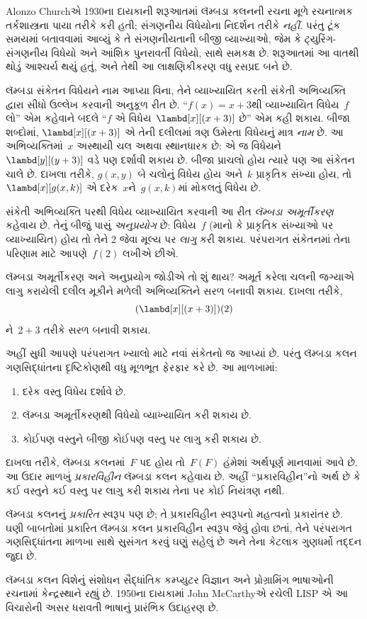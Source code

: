 \documentclass[../../../include/open-logic-section]{subfiles}
\begin{document}

Alonzo Churchએ 1930ના દાયકાની શરૂઆતમાં લૅમ્બડા કલનની રચના મૂળે
રચનાત્મક તર્કશાસ્ત્રના પાયા તરીકે કરી હતી; સંગણનીય વિધેયોના
નિદર્શન તરીકે \emph{નહીં}. પરંતુ ટૂંક સમયમાં બતાવવામાં આવ્યું કે
તે સંગણનીયતાની બીજી વ્યાખ્યાઓ, જેમ કે ટ્યુરિંગ-સંગણનીય વિધેયો
અને આંશિક પુનરાવર્તી વિધેયો, સાથે સમકક્ષ છે. શરૂઆતમાં આ વાતથી
થોડું આશ્ચર્ય થયું હતું, અને તેથી આ લાક્ષણિકીકરણ વધુ રસપ્રદ બને છે.

લૅમ્બડા સંકેતન વિધેયને નામ આપ્યા વિના, તેને વ્યાખ્યાયિત કરતી
સંકેતી અભિવ્યક્તિ દ્વારા સીધો ઉલ્લેખ કરવાની અનુકૂળ રીત છે.
``$f(x) = x + 3$થી વ્યાખ્યાયિત વિધેય~$f$ લો'' એમ કહેવાને બદલે
``$f$ એ વિધેય~$\lambd[x][(x + 3)]$ છે'' એમ કહી શકાય. બીજા શબ્દોમાં,
$\lambd[x][(x+3)]$ એ તેની દલીલમાં ત્રણ ઉમેરતા વિધેયનું માત્ર
\emph{નામ} છે. આ અભિવ્યક્તિમાં~$x$ અસ્થાયી ચલ અથવા સ્થાનધારક છે:
એ જ વિધેયને $\lambd[y][(y + 3)]$ વડે પણ દર્શાવી શકાય છે. બીજા
પ્રાચલો હોય ત્યારે પણ આ સંકેતન ચાલે છે. દાખલા તરીકે,
$g(x, y)$ બે ચલોનું વિધેય હોય અને~$k$ પ્રાકૃતિક સંખ્યા હોય,
તો~$\lambd[x][g(x,k)]$ એ દરેક~$x$ને~$g(x, k)$માં મોકલતું વિધેય છે.

સંકેતી અભિવ્યક્તિ પરથી વિધેય વ્યાખ્યાયિત કરવાની આ રીત
\emph{લૅમ્બડા અમૂર્તીકરણ} કહેવાય છે. તેનું બીજું પાસું
\emph{અનુપ્રયોગ} છે: વિધેય~$f$ (માનો કે પ્રાકૃતિક સંખ્યાઓ પર
વ્યાખ્યાયિત) હોય તો તેને 2 જેવા મૂલ્ય પર \emph{લાગુ} કરી શકાય.
પરંપરાગત સંકેતનમાં તેના પરિણામ માટે આપણે~$f(2)$ લખીએ છીએ.

લૅમ્બડા અમૂર્તીકરણ અને અનુપ્રયોગ જોડીએ તો શું થાય? અમૂર્ત કરેલા
ચલની જગ્યાએ લાગુ કરાયેલી દલીલ મૂકીને મળેલી અભિવ્યક્તિને સરળ બનાવી
શકાય. દાખલા તરીકે,
\[
(\lambd[x][(x + 3)])(2)
\]
ને~$2 + 3$ તરીકે સરળ બનાવી શકાય.

અહીં સુધી આપણે પરંપરાગત ખ્યાલો માટે નવાં સંકેતનો જ આપ્યાં છે.
પરંતુ લૅમ્બડા કલન ગણસિદ્ધાંતના દૃષ્ટિકોણથી વધુ મૂળભૂત ફેરફાર
કરે છે. આ માળખામાં:
\begin{enumerate}
\item દરેક વસ્તુ વિધેય દર્શાવે છે.
\item લૅમ્બડા અમૂર્તીકરણથી વિધેયો વ્યાખ્યાયિત કરી શકાય છે.
\item કોઈપણ વસ્તુને બીજી કોઈપણ વસ્તુ પર લાગુ કરી શકાય છે.
\end{enumerate}
દાખલા તરીકે, લૅમ્બડા કલનમાં~$F$ પદ હોય તો~$F(F)$ હંમેશાં અર્થપૂર્ણ
માનવામાં આવે છે. આ ઉદાર માળખું \emph{પ્રકારવિહીન} લૅમ્બડા કલન
કહેવાય છે. અહીં ``પ્રકારવિહીન''નો અર્થ છે કે કઈ વસ્તુને કઈ વસ્તુ
પર લાગુ કરી શકાય તેના પર કોઈ નિયંત્રણ નથી.

\begin{digress}
લૅમ્બડા કલનનું \emph{પ્રકારિત} સ્વરૂપ પણ છે; તે પ્રકારવિહીન
સ્વરૂપનો મહત્વનો પ્રકારાંતર છે. ઘણી બાબતોમાં પ્રકારિત લૅમ્બડા કલન
પ્રકારવિહીન સ્વરૂપ જેવું હોવા છતાં, તેને પરંપરાગત ગણસિદ્ધાંતના
માળખા સાથે સુસંગત કરવું ઘણું સહેલું છે અને તેના કેટલાક ગુણધર્મો
તદ્દન જુદા છે.

લૅમ્બડા કલન વિશેનું સંશોધન સૈદ્ધાંતિક કમ્પ્યુટર વિજ્ઞાન અને
પ્રોગ્રામિંગ ભાષાઓની રચનામાં કેન્દ્રસ્થાને રહ્યું છે. 1950ના
દાયકામાં John McCarthyએ રચેલી LISP એ આ વિચારોની અસર ધરાવતી
ભાષાનું પ્રારંભિક ઉદાહરણ છે.
\end{digress}
\end{document}
